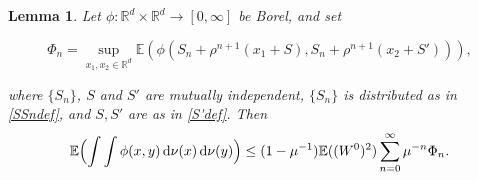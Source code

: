 \documentclass[12pt]{article}
\numberwithin{theorem}{section}
\newtheorem{lemma}[theorem]{Lemma}
\theoremstyle{def}
\numberwithin{equation}{section}
\newcommand{\E}{\mathbb{E}}
\newcommand{\R}{\mathbb{R}}
\newcommand{\SUBMIT}[1]{}
\newcommand{\ARXIV}[1]{#1}
\begin{document}
\begin{lemma}\label{secondmom}
 Let $\phi:\R^d\times\R^d\to[0,\infty]$ be Borel, and set
\ARXIV{
\begin{equation}\label{Phindef}
\Phi_n=\sup_{x_1,x_2\in\R^d}\E(\phi(S_n+\rho^{n+1}(x_1+S), S_n+\rho^{n+1}(x_2+S'))),
\end{equation}
}
\SUBMIT{
	\begin{equation*}
		\Phi_n=\sup_{x_1,x_2\in\R^d}\E(\phi(S_n+\rho^{n+1}(x_1+S), S_n+\rho^{n+1}(x_2+S'))),
	\end{equation*}
}
where $\{S_n\}$, $S$ and $S'$ are mutually independent, $\{S_n\}$ is distributed as in \eqref{SSndef}, and $S,S'$ are as in \eqref{S'def}.
 Then
\[\E\Bigl(\int\int \phi(x,y)\,\dd \nu(x)\,\dd \nu(y)\Bigr)\le (1-\mu^{-1})\E((W^0)^2)\sum_{n=0}^\infty \mu^{-n}\Phi_n.\]
\end{lemma}
\end{document}
